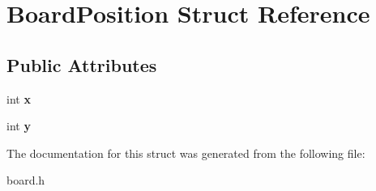 \hypertarget{struct_board_position}{}\section{Board\+Position Struct Reference}
\label{struct_board_position}
\subsection*{Public Attributes}
\begin{DoxyCompactItemize}
\item 
\hypertarget{struct_board_position_adfc976b5c3c1387ac6f03a618bd0d8bb}{}int {\bfseries x}\label{struct_board_position_adfc976b5c3c1387ac6f03a618bd0d8bb}

\item 
\hypertarget{struct_board_position_a99e9b7bc5d0061dfafb23d07baa5e3db}{}int {\bfseries y}\label{struct_board_position_a99e9b7bc5d0061dfafb23d07baa5e3db}

\end{DoxyCompactItemize}


The documentation for this struct was generated from the following file\+:\begin{DoxyCompactItemize}
\item 
board.\+h\end{DoxyCompactItemize}
